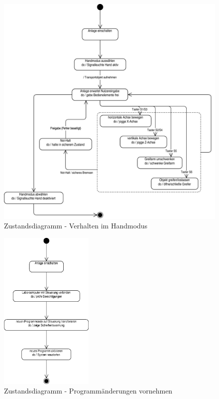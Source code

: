 \documentclass[../../../Bachelorarbeit.tex]{subfiles}
\begin{document}
\begin{figure}[H]
    \centering
    \includegraphics[width=\textwidth]{Images/hand_zustand.pdf}
    \caption[Zustandsdiagramm Handmodus]{Zustandsdiagramm - Verhalten im Handmodus}
    \label{fig:my-img5}
\end{figure}

\begin{figure}[H]
    \centering
    \includegraphics[width=0.4\textwidth]{Images/programm_zustand.pdf}
    \caption[Zustandsdiagramm Programmänderungen]{Zustandsdiagramm - Programmänderungen vornehmen}
    \label{fig:my-img6}
\end{figure}
\end{document}
